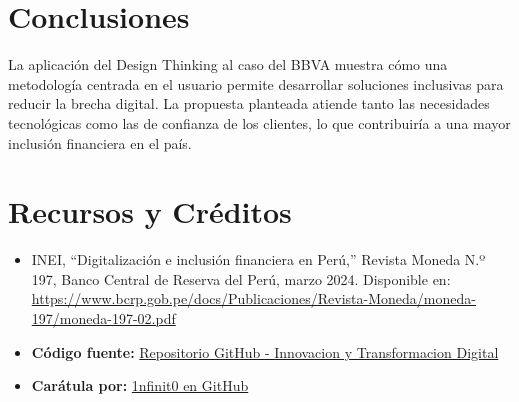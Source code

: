 \documentclass[12pt]{article}
\begin{document}
\section*{Conclusiones}
\noindent La aplicación del Design Thinking al caso del BBVA muestra cómo una metodología centrada en el usuario permite desarrollar soluciones inclusivas para reducir la brecha digital. La propuesta planteada atiende tanto las necesidades tecnológicas como las de confianza de los clientes, lo que contribuiría a una mayor inclusión financiera en el país.

\section*{Recursos y Créditos}
\begin{itemize}
  \item INEI, “Digitalización e inclusión financiera en Perú,” Revista Moneda N.º 197, Banco Central de Reserva del Perú, marzo 2024. Disponible en: \url{https://www.bcrp.gob.pe/docs/Publicaciones/Revista-Moneda/moneda-197/moneda-197-02.pdf}
  \item \textbf{Código fuente:} \href{https://github.com/MateoTVara/C08-InnovacionYTransformacionDigital}{Repositorio GitHub - Innovacion y Transformacion Digital}
  \item \textbf{Carátula por:} \href{https://github.com/1nfinit0}{1nfinit0 en GitHub}
\end{itemize}
\end{document}
